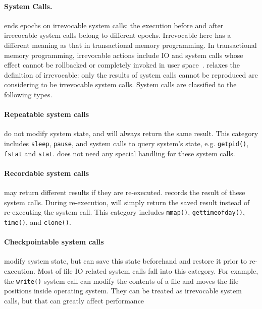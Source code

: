 \paragraph{System Calls.}

\label{sec:syscall}

\doubletake{} ends epochs on irrevocable system calls: the execution before
and after irrecocable system calls belong to different epochs.
Irrevocable here has a different meaning as that in transactional memory programming.
In transactional memory programming, irrevocable actions include IO and system calls whose
effect cannot be rollbacked or completely invoked in user space~\cite{Irrevocabletrans}.
\doubletake{} relaxes the definition of irrevocable: only the results of system calls cannot be
reproduced are considering to be irrevocable system calls.
System calls are classified to the following types.

\paragraph{Repeatable system calls} do not modify system state, and will always return the same result.
This category includes \texttt{sleep}, \texttt{pause}, and system calls to query system's state, e.g. \texttt{getpid()}, \texttt{fstat} and \texttt{stat}.
\doubletake{} does not need any special handling for these system calls.

\paragraph{Recordable system calls} may return different results if they are re-executed.
\doubletake{} records the result of these system calls.
During re-execution, \doubletake{} will simply return the saved result
instead of re-executing the system call.
This category includes \texttt{mmap()}, \texttt{gettimeofday()}, \texttt{time()}, and \texttt{clone()}.

\paragraph{Checkpointable system calls} modify system state,
but \doubletake{} can save this state beforehand and restore it prior to re-execution.
Most of file IO related system calls fall into this category.
For example, the \texttt{write()} system call can modify the contents of a file and moves the
file positions inside operating system.
They can be treated as irrevocable system calls, but that can greatly affect performance

